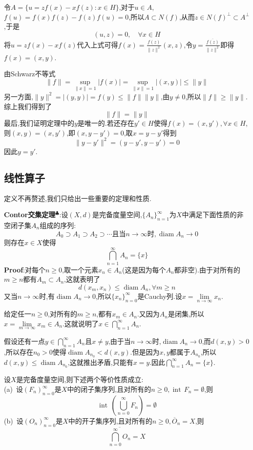 令$A=\{u=zf(x)-xf(z):x\in H\}$,对于$u\in A$,$f(u)=f(x)f(z)-f(z)f(u)=0$,所以$A\subset N(f)$,从而$z\in N(f)^{\perp}\subset A^{\perp}$,于是
$$
(u,z)=0,\quad \forall x\in H
$$
将$u=zf(x)-xf(z)$代入上式可得$f(x)=\frac{f(z)}{\|z\|^2}(x,z)$,令$y=\frac{\overline{f(z)}}{\|z\|^2}$即得$f(x)=(x,y)$.\par
由Schwarz不等式
$$
\|f\|=\sup_{\|x\|=1}|f(x)|=\sup_{\|x\|=1}|(x,y)|\leqslant \|y\|
$$
另一方面,$\|y\|^2=|(y,y)|=f(y)\leqslant \|f\|\|y\|$,由$y\neq 0$,所以$\|f\|\geqslant \|y\|$.综上我们得到了
$$
\|f\|= \|y\|
$$
\qquad 最后,我们证明定理中的$y$是唯一的.若还存在$y'\in H$使得$f(x)=(x,y'),\forall x\in H$,则$(x,y)=(x,y')$,即$(x,y-y')=0$,取$x=y-y'$得到
$$
\|y-y'\|^2=(y-y',y-y')=0
$$
因此$y=y'$.
\newpage
\subsection{线性算子}
定义不再赘述,我们只给出一些重要的定理和性质.\par
\textbf{Contor交集定理}$^\clubsuit $:设$(X,d)$是完备度量空间,$\{A_n\}_{n=1}^{\infty}$为$X$中满足下面性质的非空闭子集$A_n$组成的序列:
$$
A_0\supset A_1\supset A_2\supset \cdots\text{且当}n\to\infty\text{时},\operatorname{diam}A_n\to 0
$$
则存在$x\in X$使得
$$
\bigcap_{n=1}^{\infty}A_n=\{x\}
$$
\qquad \textbf{Proof}:对每个$n\geqslant 0$,取一个元素$x_n\in A_n$(这是因为每个$A_n$都非空).由于对所有的$m\geqslant n$都有$A_m\subset A_n$,这就表明了
$$
d(x_m,x_n)\leqslant \operatorname{diam}A_n,\forall m\geqslant n
$$
又当$n\to\infty$时,有$\operatorname{diam}A_n\to 0$,所以$\{x_n\}_{n=0}^{\infty}$是Cauchy列.设$x=\lim\limits_{n\to\infty}x_n$.\par
给定任一$n\geqslant 0$,对所有的$m\geqslant n$,都有$x_m\in A_n$.又因为$A_n$是闭集,所以$x=\lim\limits_{m\to\infty}x_m\in A_n$.这就说明了$x\in \bigcap_{n=1}^{\infty}A_n$.\par
假设还有一点$y\in \bigcap_{n=1}^{\infty}A_n$且$x\neq y$,由于当$n\to\infty$时,$\operatorname{diam}A_n\to 0$,而$d(x,y)>0$,所以存在$n_0>0$使得$\operatorname{diam}A_{n_0}<d(x,y)$.但是因为$x,y$都属于$A_{n_0}$,所以$d(x,y)\leqslant\operatorname{diam}A_{n_0}$,这就推出矛盾,只能有$x=y$.因此$\bigcap_{n=1}^{\infty}A_n=\{x\}$.\par
\begin{tcolorbox}[colback=KuangNei,colframe=BianKuang,title=\textbf{Baire定理},sharpish corners]
    设$X$是完备度量空间,则下述两个等价性质成立:\\
    (a)\, 设$(F_n)^{\infty}_{n=0}$是$X$中的闭子集序列,且对所有的$n\geqslant 0,\operatorname{int}\,F_n=\emptyset$,则
    $$
    \operatorname{int}\,\left(\bigcup^{\infty}_{n=0}F_n\right)=\emptyset
    $$
    (b)\, 设$(O_n)^{\infty}_{n=0}$是$X$中的开子集序列,且对所有的$n\geqslant 0,\overline{O}_n=X$,则
    $$
    \overline{\bigcap^{\infty}_{n=0}O_n}=X
    $$
\end{tcolorbox}
